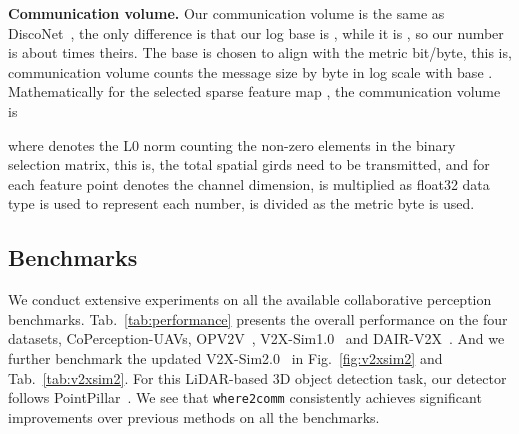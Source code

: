 \documentclass{article}
\begin{document}
\textbf{Communication volume.} Our communication volume is the same as DiscoNet~\cite{disconet}, the only difference is that our log base is , while it is , so our number is about  times theirs. The base  is chosen to align with the metric bit/byte, this is, communication volume counts the message size by byte in log scale with base . Mathematically for the selected sparse feature map
, the communication volume is

where  denotes the L0 norm counting the non-zero elements in the binary selection matrix, this is, the total spatial girds need to be transmitted, and for each feature point  denotes the channel dimension,  is multiplied as float32 data type is used to represent each number,  is divided as the metric byte is used. 



\subsection{Benchmarks}
We conduct extensive experiments on all the available collaborative perception benchmarks. Tab.~\ref{tab:performance} presents the overall performance on the four datasets, CoPerception-UAVs, OPV2V~\cite{OPV2V}, V2X-Sim1.0~\cite{disconet} and DAIR-V2X~\cite{dair}. And we further benchmark the updated V2X-Sim2.0~\cite{V2XSim} in Fig.~\ref{fig:v2xsim2} and Tab.~\ref{tab:v2xsim2}. For this LiDAR-based 3D object detection task, our detector follows PointPillar~\cite{PointPillar}. We see that \texttt{where2comm} consistently achieves significant improvements over previous methods on all the benchmarks.
\end{document}
